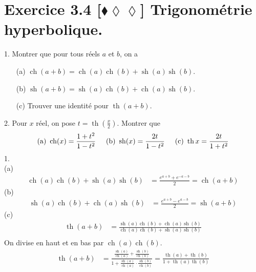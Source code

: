 \documentclass[10pt]{article}
\DeclareMathOperator{\ch}{ch}
\DeclareMathOperator{\sh}{sh}
\DeclareMathOperator{\tah}{th}
\begin{document}
\section*{Exercice 3.4 [$\blacklozenge\lozenge\lozenge$] Trigonométrie hyperbolique.}
\begin{tcolorbox}[enhanced, width=7in, center, size=fbox, fontupper=\large, drop shadow southwest]
    1. Montrer que pour tous réels $a$ et $b$, on a
    \begin{itemize}
        \item[(a)] $\ch(a+b)=\ch(a)\ch(b)+\sh(a)\sh(b)$.
        \item[(b)] $\sh(a+b)=\sh(a)\ch(b)+\ch(a)\sh(b)$.
        \item[(c)] Trouver une identité pour $\tah(a+b)$.
    \end{itemize}
    2. Pour $x$ réel, on pose $t=\tah\left(\frac{x}{2}\right)$. Montrer que
    \begin{equation*}
        \text{(a) } \ch(x)=\frac{1+t^2}{1-t^2} \hspace{0.5cm} \text{(b) } \sh(x)=\frac{2t}{1-t^2} \hspace{0.5cm} \text{(c) } \tah{x}=\frac{2t}{1+t^2}
    \end{equation*}
    1.\\
    (a)
    \begin{align*}
        \ch(a)\ch(b)+\sh(a)\sh(b)&=\frac{e^{a+b}+e^{-a-b}}{2}=\ch(a+b)
    \end{align*}
    (b)
    \begin{align*}
        \sh(a)\ch(b)+\ch(a)\sh(b)&=\frac{e^{a+b}-e^{a-b}}{2}=\sh(a+b)
    \end{align*}
    (c)
    \begin{align*}
        \tah(a+b)&=\frac{\sh(a)\ch(b)+\ch(a)\sh(b)}{\ch(a)\ch(b)+\sh(a)\sh(b)}\\
    \end{align*}
    On divise en haut et en bas par $\ch(a)\ch(b)$.
    \begin{align*}
        \tah(a+b)&=\frac{\frac{\sh(a)}{\ch(a)}+\frac{\sh(b)}{\ch(b)}}{1+\frac{\sh(a)}{\ch(a)}\cdot\frac{\sh(b)}{\ch(b)}}=\frac{\tah(a)+\tah(b)}{1+\tah(a)\tah(b)}
    \end{align*}
\end{tcolorbox}
\end{document}
